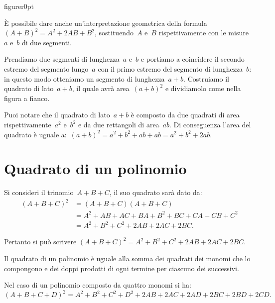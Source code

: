 \begin{wrapfloat}{figure}{r}{0pt}
 
\end{wrapfloat}

È possibile dare anche
un'interpretazione geometrica della formula~$\left(A+B\right)^{2}=A^{2}+2{AB}+B^{2}$,
sostituendo~$A$ e~$B$ rispettivamente con le misure~$a$ e~$b$
di due segmenti.

Prendiamo due segmenti di lunghezza~$a$ e~$b$ e portiamo a
coincidere il secondo estremo del segmento lungo~$a$ con il
primo estremo del segmento di lunghezza~$b$: in questo modo
otteniamo un segmento di lunghezza~$a+b$. Costruiamo il quadrato di
lato~$a+b$, il quale avrà area~$(a+b)^{2}$ e dividiamolo come
nella figura a fianco.

Puoi notare che il quadrato di lato~$a+b$ è composto da due quadrati
di area rispettivamente~$a^{2}$ e~$b^{2}$ e
da due rettangoli di area~$ab$. Di conseguenza
l'area del quadrato è uguale a:~$(a+b)^{2}=a^{2}+b^{2}+{ab}+{ab}=a^{2}+b^{2}+2{ab}$.

\vspazio\ovalbox{\risolvii \ref{ese:12.1}, \ref{ese:12.2}, \ref{ese:12.3}, \ref{ese:12.4}, \ref{ese:12.5}, \ref{ese:12.6}, \ref{ese:12.7}, \ref{ese:12.8}, \ref{ese:12.9}, \ref{ese:12.10}}

\section{Quadrato di un polinomio}\label{sect:quadrato_di_un_polinomio}

Si consideri il trinomio~$A+B+C$, il suo quadrato sarà dato da:
\begin{align*}
\left(A+B+C\right)^{2}&=\left(A+B+C\right)\left(A+B+C\right)\\
&=A^{2}+{AB}+{AC}+{BA}+B^{2}+{BC}+{CA}+{CB}+C^{2}\\
&=A^{2}+B^{2}+C^{2}+2{AB}+2{AC}+2{BC}.
\end{align*}

Pertanto si può scrivere $\left(A+B+C\right)^{2}=A^{2}+B^{2}+C^{2}+2{AB}+2{AC}+2{BC}$.

\osservazione Il quadrato di un polinomio è uguale alla somma
dei quadrati dei monomi che lo compongono e dei doppi prodotti di ogni
termine per ciascuno dei successivi.

Nel caso di un polinomio composto da quattro monomi si ha:
\[\left(A+B+C+D\right)^{2}=A^{2}+B^{2}+C^{2}+D^{2}+2{AB}+2{AC}+2{AD}+2{BC}+2{BD}+2{CD}.\]

